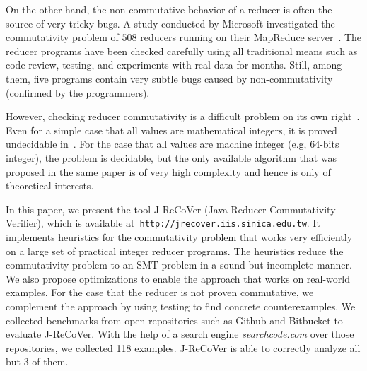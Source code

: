 \documentclass{llncs}
\newcommand{\hide}[1]{}
\begin{document}
\hide{More concretely, for the verification of a MapReduce program, we propose to do it in two phases. First, ensuring if all reducers are commutative. If some reducers are non-commutative, modifying them to commutative ones. Usually, the modification is not a difficult task~\cite{xiao14mr}, and can be done without affecting their functionality and performance. For example, assume that the task of a reducer is to find the name of the person with highest score. Such a reducer is non-commutative when the input include two people with the same highest score. This reducer can be made commutative, by also comparing the ID number of people with the same score. Once all reducers are made commutative, we reduce the verification problem to sequential verification by fixing a scheduler. In this two-phase approach, the key enabling technique is an efficient procedure for checking reducer commutativity.}

On the other hand, the non-commutative behavior of a reducer is often the source of very tricky bugs. A study conducted by Microsoft investigated the commutativity problem of $508$ reducers running on their MapReduce server~\cite{xiao14mr}. The reducer programs have been checked carefully using all traditional means such as code review, testing, and experiments with real data for months. Still, among them, five programs contain very subtle bugs caused by non-commutativity (confirmed by the programmers).

However, checking reducer commutativity is a difficult problem on its own right~\cite{ChenHSW15,ChenSW16,ChenLTW17}. Even for a simple case that all values are mathematical integers, it is proved undecidable in~\cite{ChenHSW15}. For the case that all values are machine integer (e.g, 64-bits integer), the problem is decidable, but the only available algorithm that was proposed in the same paper is of very high complexity and hence is only of theoretical interests.

In this paper, we present the tool J-ReCoVer (Java Reducer Commutativity Verifier), which is available at~\verb|http://jrecover.iis.sinica.edu.tw|. It implements
heuristics for the commutativity problem that works very efficiently on a large set of practical integer reducer programs. The heuristics reduce the commutativity problem to an SMT problem in a sound but incomplete manner. We also propose optimizations to enable the approach that works on real-world examples. For the case that the reducer is not proven commutative, we complement the approach by using testing to find concrete counterexamples. 
We collected benchmarks from open repositories such as Github and Bitbucket to evaluate J-ReCoVer. With the help of a search engine \emph{searchcode.com} over those repositories, we collected 118 examples. J-ReCoVer is able to correctly analyze all but 3 of them.
\end{document}
